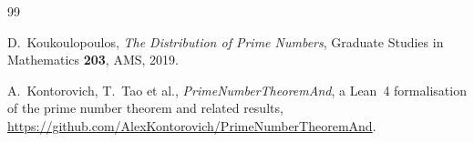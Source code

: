 \begin{thebibliography}{99}

 D.~Koukoulopoulos, \emph{The Distribution of Prime Numbers}, Graduate
Studies in Mathematics \textbf{203}, AMS, 2019.

 A.~Kontorovich, T.~Tao et al., \emph{PrimeNumberTheoremAnd}, a Lean~4 formalisation
of the prime number theorem and related results, \url{https://github.com/AlexKontorovich/PrimeNumberTheoremAnd}.

\end{thebibliography}
